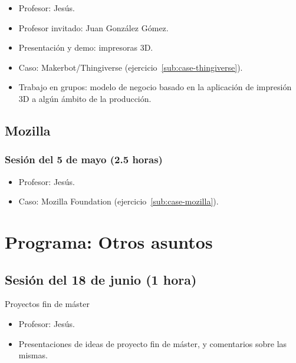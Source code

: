 \documentclass[a4paper,12pt]{article}
\begin{document}
\begin{itemize}
\item Profesor: Jesús.
\item Profesor invitado: Juan González Gómez.
\item Presentación y demo: impresoras 3D.
\item Caso: Makerbot/Thingiverse (ejercicio~\ref{sub:case-thingiverse}).
\item Trabajo en grupos: modelo de negocio basado en la aplicación de impresión 3D a algún ámbito de la producción.
\end{itemize}

\subsection{Mozilla}

\subsubsection{Sesión del 5 de mayo (2.5 horas)}

\begin{itemize}
\item Profesor: Jesús.
\item Caso: Mozilla Foundation (ejercicio~\ref{sub:case-mozilla}).
\end{itemize}

\section{Programa: Otros asuntos}

\subsection{Sesión del 18 de junio (1 hora)}

Proyectos fin de máster

\begin{itemize}
\item Profesor: Jesús.
\item Presentaciones de ideas de proyecto fin de máster, y comentarios sobre las mismas.
\end{itemize}
\end{document}
